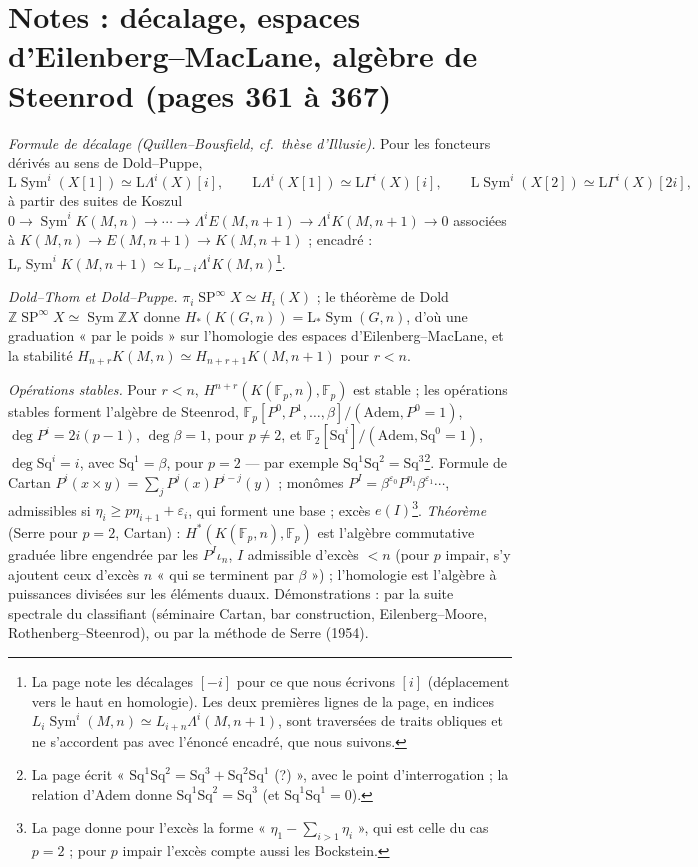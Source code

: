 \documentclass[11pt,a4paper]{article}
\begin{document}
\section*{Notes : décalage, espaces d'Eilenberg--MacLane, algèbre de Steenrod (pages 361 à 367)}

\emph{Formule de décalage (Quillen–Bousfield, cf.\ thèse d'Illusie).} Pour les
foncteurs dérivés au sens de Dold–Puppe,
\[
\mathrm{L}\operatorname{Sym}^i(X[1]) \simeq \mathrm{L}\Lambda^i(X)[i] , \qquad \mathrm{L}\Lambda^i(X[1]) \simeq \mathrm{L}\Gamma^i(X)[i] , \qquad \mathrm{L}\operatorname{Sym}^i(X[2]) \simeq \mathrm{L}\Gamma^i(X)[2i] ,
\]
à partir des suites de Koszul $0 \to \operatorname{Sym}^iK(M,n) \to \cdots \to
\Lambda^iE(M,n+1) \to \Lambda^iK(M,n+1) \to 0$ associées à $K(M,n) \to E(M,n+1)
\to K(M,n+1)$ ; encadré : $\mathrm{L}_r\operatorname{Sym}^iK(M,n+1) \simeq
\mathrm{L}_{r-i}\Lambda^iK(M,n)$\footnote{La page note les décalages $[-i]$ pour
ce que nous écrivons $[i]$ (déplacement vers le haut en homologie). Les deux
premières lignes de la page, en indices $L_i\operatorname{Sym}^i(M,n) \simeq
L_{i+n}\Lambda^i(M,n+1)$, sont traversées de traits obliques et ne s'accordent
pas avec l'énoncé encadré, que nous suivons.}.

\emph{Dold–Thom et Dold–Puppe.} $\pi_i\operatorname{SP}^\infty X \simeq H_i(X)$ ;
le théorème de Dold $\mathbb{Z}\operatorname{SP}^\infty X \simeq
\operatorname{Sym}\mathbb{Z}X$ donne $H_*(K(G,n)) = \mathrm{L}_*\operatorname{Sym}(G,
n)$, d'où une graduation « par le poids » sur l'homologie des espaces
d'Eilenberg–MacLane, et la stabilité $H_{n+r}K(M,n) \simeq H_{n+r+1}K(M,n+1)$
pour $r < n$.

\emph{Opérations stables.} Pour $r < n$, $H^{n+r}(K(\mathbb{F}_p, n),
\mathbb{F}_p)$ est stable ; les opérations stables forment l'algèbre de
Steenrod, $\mathbb{F}_p[P^0, P^1, \ldots, \beta]/(\text{Adem}, P^0 = 1)$, $\deg P^i
= 2i(p-1)$, $\deg\beta = 1$, pour $p \neq 2$, et $\mathbb{F}_2[\mathrm{Sq}^i]/
(\text{Adem}, \mathrm{Sq}^0 = 1)$, $\deg\mathrm{Sq}^i = i$, avec $\mathrm{Sq}^1 =
\beta$, pour $p = 2$ — par exemple $\mathrm{Sq}^1\mathrm{Sq}^2 =
\mathrm{Sq}^3$\footnote{La page écrit « $\mathrm{Sq}^1\mathrm{Sq}^2 =
\mathrm{Sq}^3 + \mathrm{Sq}^2\mathrm{Sq}^1$ (?) », avec le point d'interrogation ;
la relation d'Adem donne $\mathrm{Sq}^1\mathrm{Sq}^2 = \mathrm{Sq}^3$ (et
$\mathrm{Sq}^1\mathrm{Sq}^1 = 0$).}. Formule de Cartan $P^i(x \times y) = \sum_j
P^j(x)P^{i-j}(y)$ ; monômes $P^I = \beta^{\varepsilon_0}P^{\eta_1}
\beta^{\varepsilon_1}\cdots$, admissibles si $\eta_i \geq p\eta_{i+1} +
\varepsilon_i$, qui forment une base ; excès $e(I)$\footnote{La page donne pour
l'excès la forme « $\eta_1 - \sum_{i>1}\eta_i$ », qui est celle du cas $p = 2$ ;
pour $p$ impair l'excès compte aussi les Bockstein.}. \emph{Théorème} (Serre
pour $p = 2$, Cartan) : $H^*(K(\mathbb{F}_p, n), \mathbb{F}_p)$ est l'algèbre
commutative graduée libre engendrée par les $P^I\iota_n$, $I$ admissible
d'excès $< n$ (pour $p$ impair, s'y ajoutent ceux d'excès $n$ « qui se terminent
par $\beta$ ») ; l'homologie est l'algèbre à puissances divisées sur les
éléments duaux. Démonstrations : par la suite spectrale du classifiant
(séminaire Cartan, bar construction, Eilenberg–Moore, Rothenberg–Steenrod), ou
par la méthode de Serre (1954).
\end{document}
